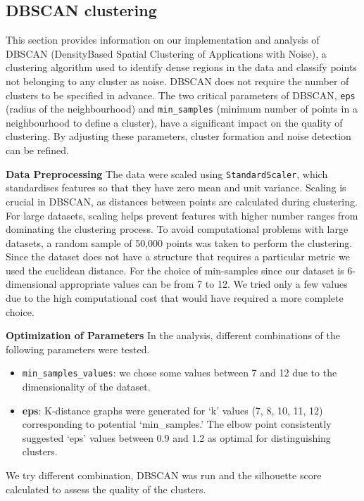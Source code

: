 \documentclass[a4paper, twoside]{article}
\begin{document}
\subsection{DBSCAN clustering}

This section provides information on our implementation and analysis of DBSCAN (Density\-Based Spatial Clustering of Applications with Noise), a clustering algorithm used to identify dense regions in the data and classify points not belonging to any cluster as noise. DBSCAN does not require the number of clusters to be specified in advance. The two critical parameters of DBSCAN, \texttt{eps} (radius of the neighbourhood) and \texttt{min\_samples} (minimum number of points in a neighbourhood to define a cluster), have a significant impact on the quality of clustering. By adjusting these parameters, cluster formation and noise detection can be refined.

\textbf{Data Preprocessing}
The data were scaled using \texttt{StandardScaler}, which standardises features so that they have zero mean and unit variance. Scaling is crucial in DBSCAN, as distances between points are calculated during clustering. For large datasets, scaling helps prevent features with higher number ranges from dominating the clustering process. To avoid computational problems with large datasets, a random sample of 50,000 points was taken to perform the clustering.
Since the dataset does not have a structure that requires a particular metric we used the euclidean distance. For the choice of min-samples since our dataset is 6-dimensional appropriate values can be from 7 to 12. We tried only a few values due to the high computational cost that would have required a more complete choice.

\textbf{Optimization of Parameters}
In the analysis, different combinations of the following parameters were tested. 
\begin{itemize}[noitemsep]
    \item \texttt{min\_samples\_values}: we chose some values between 7 and 12 due to the dimensionality of the dataset.
    
    \item \textbf{eps}: K-distance graphs were generated for ‘k’ values (7, 8, 10, 11, 12) corresponding to potential ‘min\_samples.’ The elbow point consistently suggested ‘eps’ values between 0.9 and 1.2 as optimal for distinguishing clusters.

\end{itemize}
We try different combination, DBSCAN was run and the silhouette score calculated to assess the quality of the clusters. 
\end{document}

